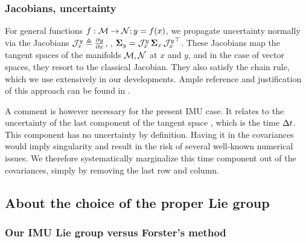\subsubsection{Jacobians, uncertainty}
\label{sec:uncertainty}

For general functions $f:\mathcal{M}\to\mathcal{N};y=f(x)$, we propagate uncertainty normally via the Jacobians 
${\mathcal{J}^{y}_{x}}\triangleq\frac{\partial y}{\partial x}$, \ie, ${\bm \Sigma}_y={\mathcal{J}^{y}_{x}}\,{\bm \Sigma}_x\,{\mathcal{J}^{y}_{x}}^{\top}$. 
These Jacobians map the tangent spaces of the manifolds $\mathcal{M},\mathcal{N}$ at $x$ and $y$, and in the case of vector spaces, they resort to the classical Jacobian.
They also satisfy the chain rule, which we use extensively in our developments.
Ample reference and justification of this approach can be found in \cite{sola2018micro}.

A comment is however necessary for the present IMU case.
It relates to the uncertainty of the last component of the tangent space , which is the time $\Delta t$. This component has no uncertainty by definition. 
Having it in the covariances would imply singularity and result in the risk of several well-known numerical issues. 
We therefore systematically marginalize this time component out of the covariances, simply by removing the last row and column. 


\subsection{About the choice of the proper Lie group}

\subsubsection{Our IMU Lie group versus Forster's method}

